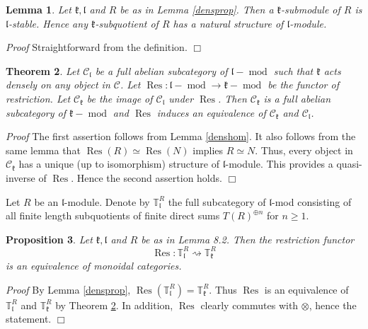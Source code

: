 \documentclass{svmult}
\newtheorem{theo}{Theorem}[section]
\newtheorem{lem}[theo]{Lemma}
\newtheorem{prop}[theo]{Proposition}
\renewenvironment{proof}{ \emph{Proof}}{$\Box$}
\newcommand{\TT}{\mathbb{T}}
\newcommand{\kk}{\mathfrak{k}}
\renewcommand{\ll}{\mathfrak{l}}
\begin{document}
\begin{lem}\label{densprop1} Let $\kk, \ll$ and $R$ be as in Lemma \ref{densprop}. Then a $\kk$-submodule of $R$ is $\ll$-stable. Hence any $\kk$-subquotient of $R$ has a natural structure of $\ll$-module.
\end{lem}
\begin{proof} Straightforward from the definition.
\end{proof}

\begin{theo}\label{theodense} Let $\mathcal C_\ll$ be a full abelian subcategory of $\ll-\operatorname{mod}$ such that $\kk$ acts densely on any object in $\mathcal C$.
Let $\operatorname {Res}:\ll-\operatorname{mod}\to \kk-\operatorname{mod}$ be the functor of restriction. Let $\mathcal C_\kk$ be the image of  $\mathcal C_\ll$ 
under  $\operatorname {Res}$. Then  $\mathcal C_\kk$ is a  full abelian subcategory of $\kk-\operatorname{mod}$ and $\operatorname{Res}$ induces an equivalence of $\mathcal C_{\kk}$ and $\mathcal C_{\ll}$.
\end{theo}

\begin{proof}
The first assertion follows from Lemma \ref{denshom}. It also follows from the same lemma that  $\operatorname{Res}(R)\simeq \operatorname{Res}(N)$
implies $R\simeq N$. Thus, every object in  $\mathcal C_\kk$ has a unique (up to isomorphism) structure of $\ll$-module. This provides a quasi-inverse of 
$\operatorname{Res}$. Hence the second assertion holds.
\end{proof}

Let $R$ be an $\ll$-module.
Denote by $\TT^R_{\ll}$ the full subcategory of $\ll$-mod consisting of all finite length subquotients of finite direct sums $T(R)^{\oplus n}$ for $n \geq 1$.

\begin{prop}\label{prop_eqcat} Let $\kk,\ll$ and $R$ be as in Lemma 8.2. Then the restriction functor
\begin{equation}\label{rest_fact}
 \operatorname{Res}:\TT^R_{\ll} \rightsquigarrow \TT^R_{\kk}\nonumber
\end{equation}
is an equivalence of monoidal categories.
\end{prop}

\begin{proof} By Lemma \ref{densprop},  $\operatorname{Res}(\TT^R_{\ll})=\TT^R_{\kk}$. Thus $\operatorname{Res}$ is an equivalence of $\TT_{\ll}^R$ and $\TT_{\kk}^R$ by Theorem \ref{theodense}. In addition, $\operatorname{Res}$ clearly commutes with $\otimes$, hence the statement.
\end{proof}
\end{document}
